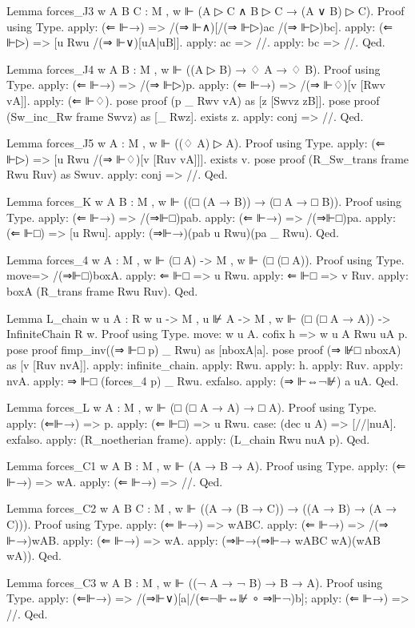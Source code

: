 \begin{spverbatim}
Lemma forces_J3 {w A B C} : M , w ⊩ (A ▷ C ∧ B ▷ C → (A ∨ B) ▷ C).
Proof using Type.
  apply: (⇐ ⊩→) => /(⇒ ⊩∧)[/(⇒ ⊩▷)ac /(⇒ ⊩▷)bc].
  apply: (⇐ ⊩▷) => [u Rwu /(⇒ ⊩∨)[uA|uB]].
  apply: ac => //.
  apply: bc => //.
Qed.

Lemma forces_J4 {w A B} : M , w ⊩ ((A ▷ B) → ♢ A → ♢ B).
Proof using Type.
  apply: (⇐ ⊩→) => /(⇒ ⊩▷)p. apply: (⇐ ⊩→) => /(⇒ ⊩♢)[v [Rwv vA]].
  apply: (⇐ ⊩♢).
  pose proof (p _ Rwv vA) as [z [Swvz zB]].
  pose proof (Sw_inc_Rw frame Swvz) as [_ Rwz].
  exists z. apply: conj => //.
Qed.

Lemma forces_J5 {w A} : M , w ⊩ ((♢ A) ▷ A).
Proof using Type.
  apply: (⇐ ⊩▷) => [u Rwu /(⇒ ⊩♢)[v [Ruv vA]]].
  exists v. pose proof (R_Sw_trans frame Rwu Ruv) as Swuv.
  apply: conj => //.
Qed.

Lemma forces_K {w A B} : M , w ⊩ ((□ (A → B)) → (□ A → □ B)).
Proof using Type.
  apply: (⇐ ⊩→) => /(⇒⊩□)pab.
  apply: (⇐ ⊩→) => /(⇒⊩□)pa.
  apply: (⇐ ⊩□) => [u Rwu].
  apply: (⇒⊩→)(pab u Rwu)(pa _ Rwu).
Qed.

Lemma forces_4 {w A} : M , w ⊩ (□ A) -> M , w ⊩ (□ (□ A)).
Proof using Type.
  move=> /(⇒⊩□)boxA.
  apply: ⇐ ⊩□ => u Rwu.
  apply: ⇐ ⊩□ => v Ruv.
  apply: boxA (R_trans frame Rwu Ruv).
Qed.

Lemma L_chain {w u A} : R w u -> M , u ⊮ A -> M , w ⊩ (□ (□ A → A)) -> InfiniteChain R w.
Proof using Type.
  move: w u A.
  cofix h => w u A Rwu uA p.
  pose proof fimp_inv((⇒ ⊩□ p) _ Rwu) as [nboxA|a].
  pose proof (⇒ ⊮□ nboxA) as [v [Ruv nvA]].
  apply: infinite_chain. apply: Rwu.
  apply: h. apply: Ruv. apply: nvA.
  apply: ⇒ ⊩□ (forces_4 p) _ Rwu.
  exfalso. apply: (⇒ ⊩⇔¬⊮) a uA.
Qed.


Lemma forces_L {w A} : M , w ⊩ (□ (□ A → A) → □ A).
Proof using Type.
  apply: (⇐⊩→) => p. apply: (⇐ ⊩□) => u Rwu.
  case: (dec u A) => [//|nuA].
  exfalso. apply: (R_noetherian frame).
  apply: (L_chain Rwu nuA p).
Qed.

Lemma forces_C1 {w A B} : M , w ⊩ (A → B → A).
Proof using Type.
  apply: (⇐ ⊩→) => wA. apply: (⇐ ⊩→) => //.
Qed.

Lemma forces_C2 {w A B C} : M , w ⊩ ((A → (B → C)) → ((A → B) → (A → C))).
Proof using Type.
  apply: (⇐ ⊩→) => wABC. apply: (⇐ ⊩→) => /(⇒ ⊩→)wAB. apply: (⇐ ⊩→) => wA.
  apply: (⇒⊩→(⇒⊩→ wABC wA)(wAB wA)).
Qed.

Lemma forces_C3 {w A B} : M , w ⊩ ((¬ A → ¬ B) → B → A).
Proof using Type.
  apply: (⇐⊩→) => /(⇒⊩∨)[a|/(⇐¬⊩⇔⊮ ∘ ⇒⊩¬)b]; apply: (⇐ ⊩→) => //.
Qed.


\end{spverbatim}
